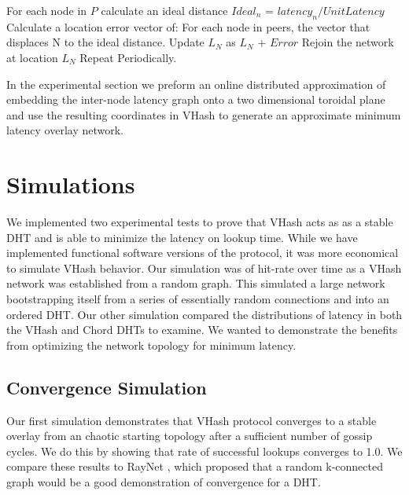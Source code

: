 \documentclass{IEEEtran}
\begin{document}
For each node in $P$ calculate an ideal distance $Ideal_n$ = $latency_n / UnitLatency$
Calculate a location error vector of:
	For each node in peers, the vector that displaces N to the ideal distance.
Update $L_N$ as $L_N$ + $Error$
Rejoin the network at location $L_N$
Repeat Periodically.




In the experimental section we preform an online distributed approximation of embedding the inter-node latency graph onto a two dimensional toroidal plane and use the resulting coordinates in VHash to generate an approximate minimum latency overlay network. 


\section{Simulations}

We implemented two experimental tests to prove that VHash acts as as a stable DHT and is able to minimize the latency on lookup time.
While we have implemented functional software versions of the protocol, it was more economical to simulate VHash behavior.
Our simulation was of hit-rate over time as a VHash network was established from a random graph.  
This simulated a large network bootstrapping itself from a series of essentially random connections and into an ordered DHT.  
Our other simulation compared the distributions of latency in both the VHash and Chord DHTs to examine. 
We wanted to demonstrate the benefits from optimizing the network topology for minimum latency.

\subsection{Convergence Simulation}
Our first simulation demonstrates that VHash protocol converges to a stable overlay from an chaotic starting topology after a sufficient number of gossip cycles.  
We do this by showing that rate of successful lookups converges to 1.0.
We compare these results to RayNet \cite{raynet}, which proposed that a random k-connected graph would be a good demonstration of convergence for a DHT.
\end{document}
